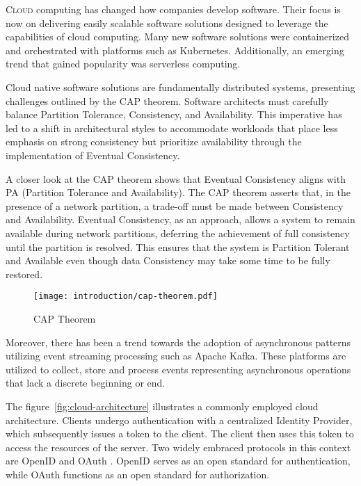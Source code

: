 \lettrine{C}{loud} computing has changed how companies develop software. Their focus is now on delivering easily scalable software solutions designed to leverage the capabilities of cloud computing.
Many new software solutions were containerized and orchestrated with platforms such as Kubernetes. Additionally, an emerging trend that gained popularity was serverless computing.

Cloud native software solutions are fundamentally distributed systems, presenting challenges outlined by the CAP theorem. Software architects must carefully balance Partition Tolerance, Consistency, and Availability.
This imperative has led to a shift in architectural styles to accommodate workloads that place less emphasis on strong consistency but prioritize availability through the implementation of Eventual Consistency.

\begin{boxF}
    A closer look at the CAP theorem shows that Eventual Consistency aligns with PA (Partition Tolerance and Availability).
    The CAP theorem \cite{c1} asserts that, in the presence of a network partition, a trade-off must be made between Consistency and Availability.
    Eventual Consistency, as an approach, allows a system to remain available during network partitions, deferring the achievement of full consistency until the partition is resolved.
    This ensures that the system is Partition Tolerant and Available even though data Consistency may take some time to be fully restored.
\end{boxF}

\begin{figure}[h]
    \centering
    \texttt{[image: introduction/cap-theorem.pdf]}
    \caption{CAP Theorem}
    \label{fig:cap-theorem}
\end{figure}

Moreover, there has been a trend towards the adoption of asynchronous patterns utilizing event streaming processing such as Apache Kafka.
These platforms are utilized to collect, store and process events representing asynchronous operations that lack a discrete beginning or end.

The figure~\ref{fig:cloud-architecture} illustrates a commonly employed cloud architecture. Clients undergo authentication with a centralized Identity Provider, which subsequently issues a token to the client.
The client then uses this token to access the resources of the server.
Two widely embraced protocols in this context are OpenID \cite{c4} and OAuth \cite{c5}. OpenID serves as an open standard for authentication, while OAuth functions as an open standard for authorization.

